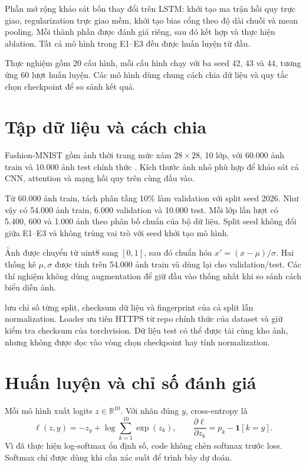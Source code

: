 \documentclass[12pt,a4paper]{report}
\numberwithin{equation}{chapter}
\newcommand{\R}{\mathbb{R}}
\newcommand{\code}[1]{\texttt{\detokenize{#1}}}
\begin{document}
Phần mở rộng khảo sát bốn thay đổi trên LSTM: khởi tạo ma trận hồi quy trực giao, regularization trực giao mềm, khởi tạo bias cổng theo độ dài chuỗi và mean pooling. Mỗi thành phần được đánh giá riêng, sau đó kết hợp và thực hiện ablation. Tất cả mô hình trong E1–E3 đều được huấn luyện từ đầu.

Thực nghiệm gồm 20 cấu hình, mỗi cấu hình chạy với ba seed 42, 43 và 44, tương ứng 60 lượt huấn luyện. Các mô hình dùng chung cách chia dữ liệu và quy tắc chọn checkpoint để so sánh kết quả.

\section{Tập dữ liệu và cách chia}
Fashion-MNIST gồm ảnh thời trang mức xám $28\times28$, 10 lớp, với 60.000 ảnh train và 10.000 ảnh test chính thức \cite{fashion}. Kích thước ảnh nhỏ phù hợp để khảo sát cả CNN, attention và mạng hồi quy trên cùng đầu vào.

Từ 60.000 ảnh train, tách phân tầng 10\% làm validation với split seed 2026. Như vậy có 54.000 ảnh train, 6.000 validation và 10.000 test. Mỗi lớp lần lượt có 5.400, 600 và 1.000 ảnh theo phân bố chuẩn của bộ dữ liệu. Split seed không đổi giữa E1–E3 và không trùng vai trò với seed khởi tạo mô hình.

Ảnh được chuyển từ uint8 sang $[0,1]$, sau đó chuẩn hóa $x'=(x-\mu)/\sigma$. Hai thống kê $\mu,\sigma$ được tính trên 54.000 ảnh train và dùng lại cho validation/test. Các thí nghiệm không dùng augmentation để giữ đầu vào thống nhất khi so sánh cách biểu diễn ảnh.

\code{common/data.py} lưu chỉ số từng split, checksum dữ liệu và fingerprint của cả split lẫn normalization. Loader ưu tiên HTTPS từ repo chính thức của dataset và giữ kiểm tra checksum của torchvision. Dữ liệu test có thể được tải cùng kho ảnh, nhưng không được đọc vào vòng chọn checkpoint hay tính normalization.

\section{Huấn luyện và chỉ số đánh giá}
Mỗi mô hình xuất logits $z\in\R^{10}$. Với nhãn đúng $y$, cross-entropy là
\begin{equation}
\ell(z,y)=-z_y+\log\sum_{k=1}^{10}\exp(z_k),
\qquad \frac{\partial\ell}{\partial z_k}=p_k-\mathbf{1}[k=y].
\end{equation}
Vì \code{cross_entropy} đã thực hiện log-softmax ổn định số, code không chèn softmax trước loss. Softmax chỉ được dùng khi cần xác suất để trình bày dự đoán.
\end{document}
